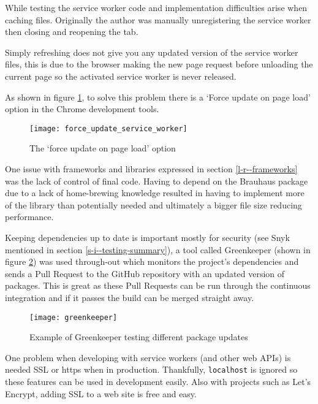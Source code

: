 
While testing the service worker code and implementation difficulties arise when caching files. Originally the author was manually unregistering the service worker then closing and reopening the tab.

Simply refreshing does not give you any updated version of the service worker files, this is due to the browser making the new page request before unloading the current page so the activated service worker is never released. \cite{refresh_sw}

As shown in figure \ref{figure-force-update-service-worker}, to solve this problem there is a `Force update on page load' option in the Chrome development tools.

\begin{figure}[H]
  \centering
    \texttt{[image: force\_update\_service\_worker]}
  \caption{The `force update on page load' option}
  \label{figure-force-update-service-worker}
\end{figure}

One issue with frameworks and libraries expressed in section \ref{l-r--frameworks} was the lack of control of final code. Having to depend on the Brauhaus package due to a lack of home-brewing knowledge resulted in having to implement more of the library than potentially needed and ultimately a bigger file size reducing performance.

Keeping dependencies up to date is important mostly for security (see Snyk mentioned in section \ref{s-i--testing-summary}), a tool called Greenkeeper (shown in figure \ref{figure-greenkeeper}) was used through-out which monitors the project's dependencies and sends a Pull Request to the GitHub repository with an updated version of packages. This is great as these Pull Requests can be run through the continuous integration and if it passes the build can be merged straight away. \cite{greenkeeper}

\begin{figure}[H]
  \centering
    \texttt{[image: greenkeeper]}
  \caption{Example of Greenkeeper testing different package updates}
  \label{figure-greenkeeper}
\end{figure}

One problem when developing with service workers (and other web APIs) is needed SSL or https when in production. Thankfully, \verb|localhost| is ignored so these features can be used in development easily. Also with projects such as Let's Encrypt, adding SSL to a web site is free and easy. \cite{letsencrypt}


